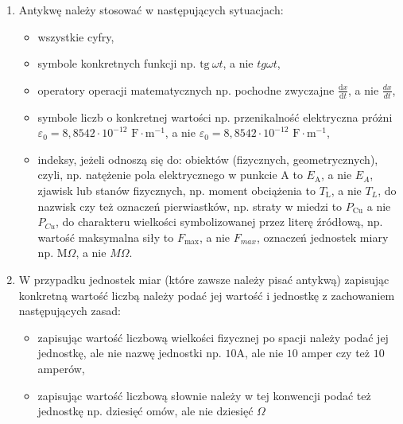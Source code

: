\documentclass[12pt,twoside]{article}
\begin{document}
\begin{enumerate}[label=\arabic*), leftmargin=1.25cm]
\begin{itemize}[label=-,labelsep=0.4cm,leftmargin=0.6cm]
\end{itemize}

\item Antykwę należy stosować w następujących sytuacjach:

\begin{itemize}[label=-,labelsep=0.4cm,leftmargin=0.6cm]
\item wszystkie cyfry,

\item symbole konkretnych funkcji np. $\mathrm{tg\ } \omega t$, a nie $tg \omega t$,

\item operatory operacji matematycznych np. pochodne zwyczajne $\frac{\mathrm{d} x}{\mathrm{d} t}$, a nie $\frac{d x}{d t}$,

\item symbole liczb o konkretnej wartości np. przenikalność elektryczna próżni $\varepsilon_0 = 8,8542 \cdot 10^{-12}$ $\mathrm{F} \cdot \mathrm{m}^{-1}$, a nie $\varepsilon_0 = 8,8542 \cdot 10^{-12}$ $\mathrm{F} \cdot \mathrm{m}^{-1}$,

\item indeksy, jeżeli odnoszą się do: obiektów (fizycznych, geometrycznych), czyli, np. natężenie pola elektrycznego w punkcie A to $E_\mathrm{A}$, a nie $E_A$, zjawisk lub stanów fizycznych, np. moment obciążenia to $T_\mathrm{L}$, a nie $T_L$, do nazwisk czy też oznaczeń pierwiastków, np. straty w miedzi to $P_{\mathrm{Cu}}$ a nie $P_{Cu}$, do charakteru wielkości symbolizowanej przez literę źródłową, np. wartość maksymalna siły to $F_\mathrm{max}$, a nie $F_{max}$, oznaczeń jednostek miary np. $\mathrm{M}\Omega$, a nie $M \mathit{\Omega}$.

\end{itemize}

\item W przypadku jednostek miar (które zawsze należy pisać antykwą) zapisując konkretną wartość liczbą należy podać jej wartość i jednostkę z zachowaniem następujących zasad:

\begin{itemize}[label=-,labelsep=0.4cm,leftmargin=0.6cm]
\item zapisując wartość liczbową wielkości fizycznej po spacji należy podać jej jednostkę, ale nie nazwę jednostki np. $10 \mathrm{A}$, ale nie $10$ amper czy też $10$ amperów,

\item zapisując wartość liczbową słownie należy w tej konwencji podać też jednostkę np. dziesięć omów, ale nie dziesięć $\Omega$


\end{itemize}
\end{enumerate}
\end{document}
